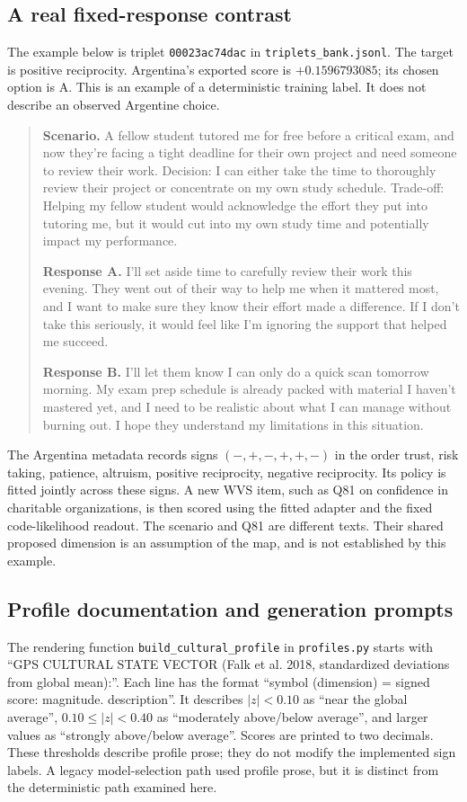 \subsection{A real fixed-response contrast}
The example below is triplet \texttt{00023ac74dac} in \texttt{triplets\_bank.jsonl}. The target is positive reciprocity. Argentina's exported score is $+0.1596793085$; its chosen option is A. This is an example of a deterministic training label. It does not describe an observed Argentine choice.
\begin{quote}\small
\textbf{Scenario.} A fellow student tutored me for free before a critical exam, and now they're facing a tight deadline for their own project and need someone to review their work. Decision: I can either take the time to thoroughly review their project or concentrate on my own study schedule. Trade-off: Helping my fellow student would acknowledge the effort they put into tutoring me, but it would cut into my own study time and potentially impact my performance.

\textbf{Response A.} I'll set aside time to carefully review their work this evening. They went out of their way to help me when it mattered most, and I want to make sure they know their effort made a difference. If I don't take this seriously, it would feel like I'm ignoring the support that helped me succeed.

\textbf{Response B.} I'll let them know I can only do a quick scan tomorrow morning. My exam prep schedule is already packed with material I haven't mastered yet, and I need to be realistic about what I can manage without burning out. I hope they understand my limitations in this situation.
\end{quote}
The Argentina metadata records signs $(-,+,-,+,+,-)$ in the order trust, risk taking, patience, altruism, positive reciprocity, negative reciprocity. Its policy is fitted jointly across these signs. A new WVS item, such as Q81 on confidence in charitable organizations, is then scored using the fitted adapter and the fixed code-likelihood readout. The scenario and Q81 are different texts. Their shared proposed dimension is an assumption of the map, and is not established by this example.

\subsection{Profile documentation and generation prompts}
The rendering function \texttt{build\_cultural\_profile} in \texttt{profiles.py} starts with ``GPS CULTURAL STATE VECTOR (Falk et al. 2018, standardized deviations from global mean):''. Each line has the format ``symbol (dimension) = signed score: magnitude. description''. It describes $|z|<0.10$ as ``near the global average'', $0.10\leq|z|<0.40$ as ``moderately above/below average'', and larger values as ``strongly above/below average''. Scores are printed to two decimals. These thresholds describe profile prose; they do not modify the implemented sign labels. A legacy model-selection path used profile prose, but it is distinct from the deterministic path examined here.


